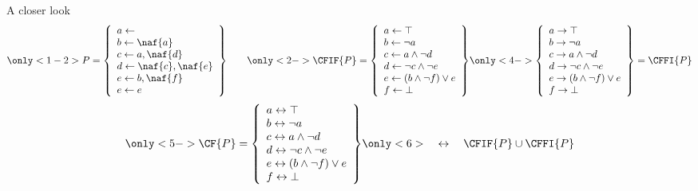 \begin{frame}{A closer look}
\[
\only<1-2>{%
P
=
 \left\{
    \begin{array}{l}
      a \leftarrow                  \\
      b \leftarrow \naf{a}          \\
      c \leftarrow a, \naf{d}       \\
      d \leftarrow \naf{c}, \naf{e} \\
      e \leftarrow b, \naf{f}       \\
      e \leftarrow e
    \end{array}
  \right\}
\qquad}
\only<2->{%
\CFIF{P}
=
 \left\{
    \begin{array}{l}
      a \leftarrow \top                  \\
      b \leftarrow \neg{a}               \\
      c \leftarrow a\wedge \neg{d}       \\
      d \leftarrow \neg{c}\wedge \neg{e} \\
      e \leftarrow (b\wedge \neg{f}) \vee e\\
      f \leftarrow \bot
    \end{array}
  \right\}
}
\only<4->{%
 \left\{
    \begin{array}{l}
      a \rightarrow \top                  \\
      b \rightarrow \neg{a}               \\
      c \rightarrow a\wedge \neg{d}       \\
      d \rightarrow \neg{c}\wedge \neg{e} \\
      e \rightarrow (b\wedge \neg{f}) \vee e\\
      f \rightarrow \bot
    \end{array}
  \right\}
  =
  \CFFI{P}}
\]
\[
\only<5->{%
  \CF{P}
  =
  \left\{
    \begin{array}{l}
      a \leftrightarrow \top                  \\
      b \leftrightarrow \neg{a}               \\
      c \leftrightarrow a\wedge \neg{d}       \\
      d \leftrightarrow \neg{c}\wedge \neg{e} \\
      e \leftrightarrow (b\wedge \neg{f}) \vee e\\
      f \leftrightarrow \bot
    \end{array}
  \right\}}
\only<6>{\quad\leftrightarrow\quad\CFIF{P}\cup\CFFI{P}}
\]
\end{frame}

